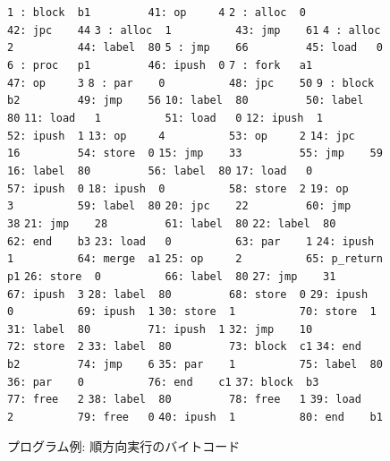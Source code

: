 \documentclass[submit,PRO]{ipsj}
\def\|{\verb|}
\begin{document}
\begin{figure}[tb]
\vbox{
\hbox{\|1 : block  b1         41: op     4|}
\hbox{\|2 : alloc  0          42: jpc    44|}
\hbox{\|3 : alloc  1          43: jmp    61|}
\hbox{\|4 : alloc  2          44: label  80|}
\hbox{\|5 : jmp    66         45: load   0|}
\hbox{\|6 : proc   p1         46: ipush  0|}
\hbox{\|7 : fork   a1         47: op     3|}
\hbox{\|8 : par    0          48: jpc    50|}
\hbox{\|9 : block  b2         49: jmp    56|}
\hbox{\|10: label  80         50: label  80|}
\hbox{\|11: load   1          51: load   0|}
\hbox{\|12: ipush  1          52: ipush  1|}
\hbox{\|13: op     4          53: op     2|}
\hbox{\|14: jpc    16         54: store  0|}
\hbox{\|15: jmp    33         55: jmp    59|}
\hbox{\|16: label  80         56: label  80|}
\hbox{\|17: load   0          57: ipush  0|}
\hbox{\|18: ipush  0          58: store  2|}
\hbox{\|19: op     3          59: label  80|}
\hbox{\|20: jpc    22         60: jmp    38|}
\hbox{\|21: jmp    28         61: label  80|}
\hbox{\|22: label  80         62: end    b3|}
\hbox{\|23: load   0          63: par    1|}
\hbox{\|24: ipush  1          64: merge  a1|}
\hbox{\|25: op     2          65: p_return p1|}
\hbox{\|26: store  0          66: label  80|}
\hbox{\|27: jmp    31         67: ipush  3|}
\hbox{\|28: label  80         68: store  0|}
\hbox{\|29: ipush  0          69: ipush  1|}
\hbox{\|30: store  1          70: store  1|}
\hbox{\|31: label  80         71: ipush  1|}
\hbox{\|32: jmp    10         72: store  2|}
\hbox{\|33: label  80         73: block  c1|}
\hbox{\|34: end    b2         74: jmp    6|}
\hbox{\|35: par    1          75: label  80|}
\hbox{\|36: par    0          76: end    c1|}
\hbox{\|37: block  b3         77: free   2|}
\hbox{\|38: label  80         78: free   1|}
\hbox{\|39: load   2          79: free   0|}
\hbox{\|40: ipush  1          80: end    b1|}
}
\centerline{}
\caption{プログラム例: 順方向実行のバイトコード}
\label{fig:bytecode}
\end{figure}
\end{document}
